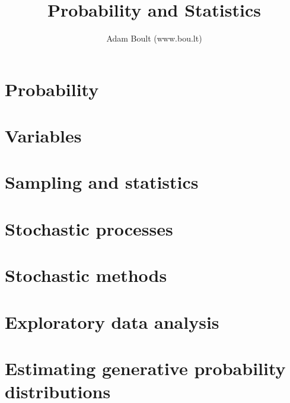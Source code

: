 \documentclass[oneside]{book}
\begin{document}
\author{Adam Boult (www.bou.lt)}
\title{Probability and Statistics}
\maketitle

\setcounter{tocdepth}{0}
\tableofcontents



\part{Probability}




\part{Variables}




\part{Sampling and statistics}






\part{Stochastic processes}






\part{Stochastic methods}





\part{Exploratory data analysis}







\part{Estimating generative probability distributions}











\end{document}
